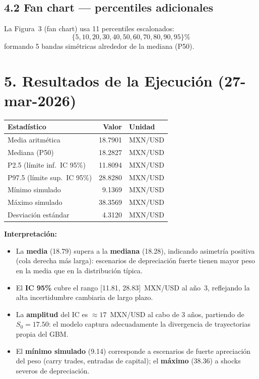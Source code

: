 \documentclass[11pt,letterpaper]{article}
\begin{document}
\subsection*{4.2 Fan chart — percentiles adicionales}

La Figura~3 (fan chart) usa 11 percentiles escalonados:
\[
\{5, 10, 20, 30, 40, 50, 60, 70, 80, 90, 95\}\%
\]
formando 5 bandas simétricas alrededor de la mediana (P50).

\section*{5. Resultados de la Ejecución (27-mar-2026)}

\begin{infobox}[title=Estadísticas al Año 3 — Horizonte Completo (marzo 2029)]
\begin{center}
\begin{tabular}{@{}lrl@{}}
\toprule
\textbf{Estadístico} & \textbf{Valor} & \textbf{Unidad} \\
\midrule
Media aritmética      & 18.7901 & MXN/USD \\
Mediana (P50)         & 18.2827 & MXN/USD \\
P2.5 (límite inf.\ IC 95\%) & 11.8094 & MXN/USD \\
P97.5 (límite sup.\ IC 95\%) & 28.8280 & MXN/USD \\
Mínimo simulado       & \phantom{0}9.1369 & MXN/USD \\
Máximo simulado       & 38.3569 & MXN/USD \\
Desviación estándar   & \phantom{0}4.3120 & MXN/USD \\
\bottomrule
\end{tabular}
\end{center}
\end{infobox}

\vspace{0.3cm}

\noindent\textbf{Interpretación:}
\begin{itemize}
    \item La \textbf{media} (18.79) supera a la \textbf{mediana} (18.28),
          indicando asimetría positiva (cola derecha más larga): escenarios
          de depreciación fuerte tienen mayor peso en la media que en la
          distribución típica.
    \item El \textbf{IC 95\%} cubre el rango [11.81, 28.83]~MXN/USD al
          año~3, reflejando la alta incertidumbre cambiaria de largo plazo.
    \item La \textbf{amplitud} del IC es $\approx 17$~MXN/USD al cabo de
          3 años, partiendo de $S_0 = 17.50$: el modelo captura adecuadamente
          la divergencia de trayectorias propia del GBM.
    \item El \textbf{mínimo simulado} (9.14) corresponde a escenarios de
          fuerte apreciación del peso (carry trades, entradas de capital);
          el \textbf{máximo} (38.36) a shocks severos de depreciación.
\end{itemize}
\end{document}
